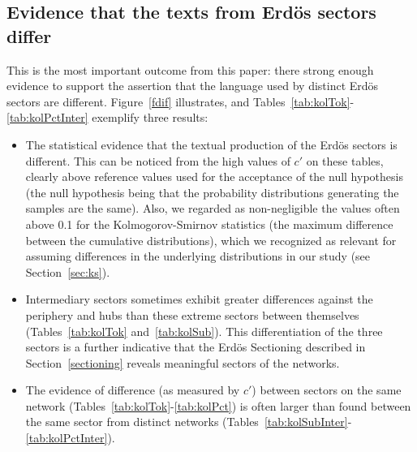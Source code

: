 \documentclass[review]{elsarticle}
\begin{document}
\subsection{Evidence that the texts from Erd\"os sectors differ}\label{subsec:di}
This is the most important outcome from this paper: there strong enough evidence
to support the assertion that the language used by distinct Erd\"os sectors are different.
Figure~\ref{fdif} illustrates, and Tables~\ref{tab:kolTok}-\ref{tab:kolPctInter}
exemplify three results:
\begin{itemize}
 \item The statistical evidence that the textual production of the Erd\"os sectors is different.
	 This can be noticed from the high values of $c'$ on these tables, clearly above reference values used for the acceptance of the null hypothesis (the null hypothesis being that the probability distributions generating the samples are the same). Also, we regarded as non-negligible the values often above 0.1 for the Kolmogorov-Smirnov statistics (the maximum difference between the cumulative distributions), which we recognized as relevant for assuming differences in the underlying distributions in our study (see Section~\ref{sec:ks}).
  \item Intermediary sectors sometimes exhibit greater differences 
against the periphery and hubs than these extreme sectors between themselves 
(Tables~\ref{tab:kolTok} and~\ref{tab:kolSub}).
This differentiation of the three sectors is a further indicative that the Erd\"os Sectioning described in Section~\ref{sectioning} reveals meaningful sectors of the networks.
 \item The evidence of difference (as measured by $c'$) between sectors on the same network (Tables~\ref{tab:kolTok}-\ref{tab:kolPct}) is often larger than found between the same sector from distinct networks (Tables~\ref{tab:kolSubInter}-\ref{tab:kolPctInter}).
 \end{itemize}
\end{document}
